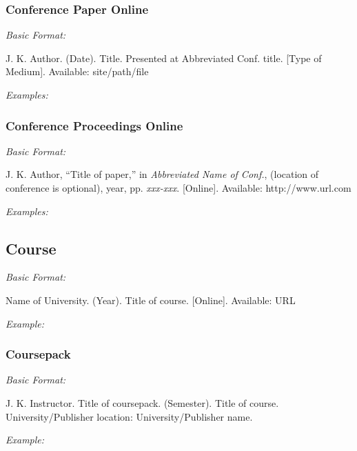 \documentclass[10pt]{article}
\newcommand*{\guidelabel}[1]{\par\vspace{-4pt}\hspace*{22pt}\textit{#1}\par\vspace{-\parskip}}
\begin{document}
\subsubsection{Conference Paper Online}
\guidelabel{Basic Format:}
\begin{guideitems}
  \item J. K. Author. (Date). Title. Presented at Abbreviated Conf. title. [Type of Medium]. Available: site/path/file
\end{guideitems}
\guidelabel{Examples:}
\begin{guideitems}
  \item {}
  \item {}
  \item {}
\end{guideitems}

\subsubsection{Conference Proceedings Online}
\guidelabel{Basic Format:}
\begin{guideitems}
  \item J. K. Author, “Title of paper,” in \textit{Abbreviated Name of Conf.}, (location of conference is optional), year, pp. \textit{xxx-xxx}. [Online]. Available: http://www.url.com
\end{guideitems}
\guidelabel{Examples:}
\begin{guideitems}
  \item {}
  \item {}
\end{guideitems}

\subsection{Course}
\guidelabel{Basic Format:}
\begin{guideitems}
  \item Name of University. (Year). Title of course. [Online]. Available: URL
\end{guideitems}
\guidelabel{Example:}
\begin{guideitems}
  \item {}
\end{guideitems}

\subsubsection{Coursepack}
\guidelabel{Basic Format:}
\begin{guideitems}
  \item J. K. Instructor. Title of coursepack. (Semester). Title of course. University/Publisher location: University/Publisher name.
\end{guideitems}
\guidelabel{Example:}
\begin{guideitems}
  \item {}
\end{guideitems}
\end{document}
